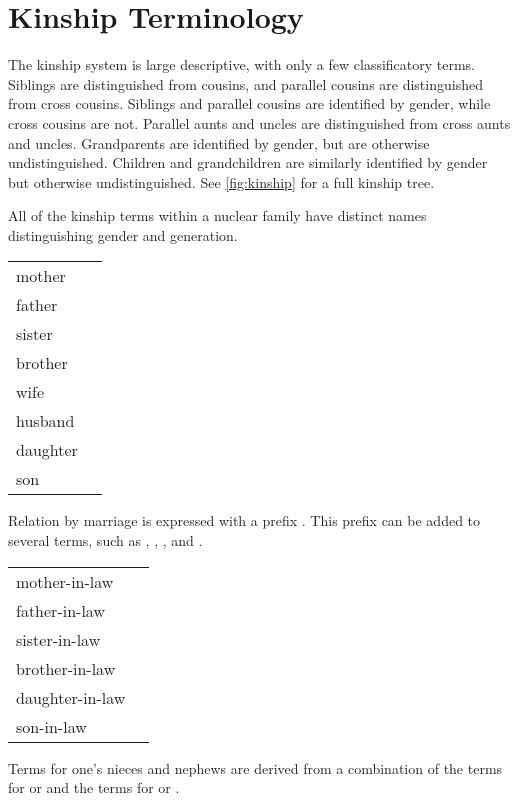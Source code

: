 \chapter{Kinship Terminology}
\label{app:kinship}

The \lang{} kinship system is large descriptive, with only a few classificatory terms. Siblings are distinguished from cousins, and parallel cousins are distinguished from cross cousins. Siblings and parallel cousins are identified by gender, while cross cousins are not. Parallel aunts and uncles are distinguished from cross aunts and uncles. Grandparents are identified by gender, but are otherwise undistinguished. Children and grandchildren are similarly identified by gender but otherwise undistinguished. See \autoref{fig:kinship} for a full kinship tree.

All of the kinship terms within a nuclear family have distinct names distinguishing gender and generation.

\exdisplay\noexno
	\begin{tabu} {l l}
		mother & \\
		father & \\
		sister & \\
		brother & \\
		wife & \\
		husband & \\
		daughter & \\
		son & \\
	\end{tabu}
\xe

Relation by marriage is expressed with a prefix . This prefix can be added to several terms, such as , , , and .

\exdisplay\noexno
	\begin{tabu} {l l}
		mother-in-law & \\
		father-in-law & \\
		sister-in-law & \\
		brother-in-law & \\
		daughter-in-law & \\
		son-in-law & \\
	\end{tabu}
\xe

Terms for one's nieces and nephews are derived from a combination of the terms for  or  and the terms for  or .

